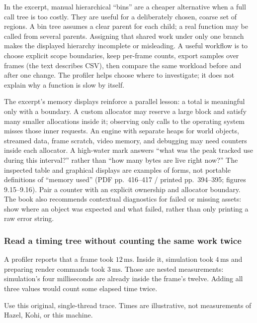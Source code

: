 In the excerpt, manual hierarchical ``bins'' are a cheaper alternative when a full call tree is too costly. They are useful for a deliberately chosen, coarse set of regions. A bin tree assumes a clear parent for each child; a real function may be called from several parents. Assigning that shared work under only one branch makes the displayed hierarchy incomplete or misleading. A useful workflow is to choose explicit scope boundaries, keep per-frame counts, export samples over frames (the text describes CSV), then compare the same workload before and after one change. The profiler helps choose where to investigate; it does not explain why a function is slow by itself.

The excerpt's memory displays reinforce a parallel lesson: a total is meaningful only with a boundary. A custom allocator may reserve a large block and satisfy many smaller allocations inside it; observing only calls to the operating system misses those inner requests. An engine with separate heaps for world objects, streamed data, frame scratch, video memory, and debugging may need counters inside each allocator. A high-water mark answers ``what was the peak tracked use during this interval?'' rather than ``how many bytes are live right now?'' The inspected table and graphical displays are examples of forms, not portable definitions of ``memory used'' (PDF pp.~416--417 / printed pp.~394--395; figures 9.15--9.16). Pair a counter with an explicit ownership and allocator boundary. The book also recommends contextual diagnostics for failed or missing assets: show where an object was expected and what failed, rather than only printing a raw error string.

\subsubsection{Read a timing tree without counting the same work twice}\label{read-a-timing-tree-without-counting-the-same-work-twice}

A profiler reports that a frame took \(12\,\mathrm{ms}\). Inside it, simulation took \(4\,\mathrm{ms}\) and preparing render commands took \(3\,\mathrm{ms}\). Those are nested measurements: simulation's four milliseconds are already inside the frame's twelve. Adding all three values would count some elapsed time twice.

Use this original, single-thread trace. Times are illustrative, not measurements of Hazel, Kohi, or this machine.

